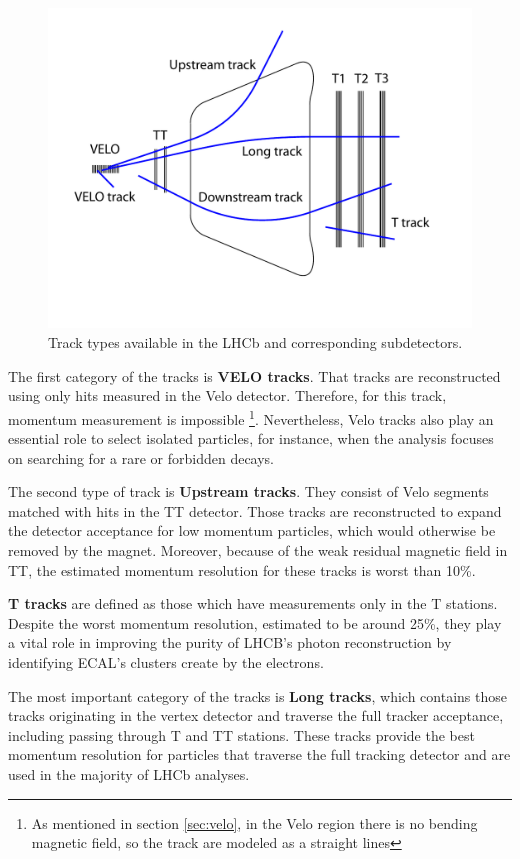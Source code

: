 \begin{figure}
\centering
\includegraphics[scale=0.9]{figures/trackTypes.pdf}
\caption{Track types available in the LHCb and corresponding subdetectors. 
\label{fig:track_types}}
\end{figure}

The first category of the tracks is \textbf{VELO tracks}. That tracks are reconstructed using only hits measured in the Velo detector. Therefore, for this track, momentum measurement is impossible \footnote{As mentioned in section \ref{sec:velo}, in the Velo region there is no bending magnetic field, so the track are modeled as a straight lines}. Nevertheless, Velo tracks also play an essential role to select isolated particles, for instance, when the analysis focuses on searching for a rare or forbidden decays. 

The second type of track is \textbf{Upstream tracks}. They consist of Velo segments matched with hits in the TT detector. Those tracks are reconstructed to expand the detector acceptance for low momentum particles, which would otherwise be removed by the magnet. Moreover, because of the weak residual magnetic field in TT, the estimated momentum resolution for these tracks is worst than 10\%.

\textbf{T tracks} are defined as those which have measurements only in the T stations. Despite the worst momentum resolution, estimated to be around 25\%, they play a vital role in improving the purity of LHCB's photon reconstruction by identifying ECAL's clusters create by the electrons. 

The most important category of the tracks is \textbf{Long tracks}, which contains those tracks originating in the vertex detector and traverse the full tracker acceptance, including passing through T and TT stations. These tracks provide the best momentum resolution for particles that traverse the full tracking detector and are used in the majority of LHCb analyses.

